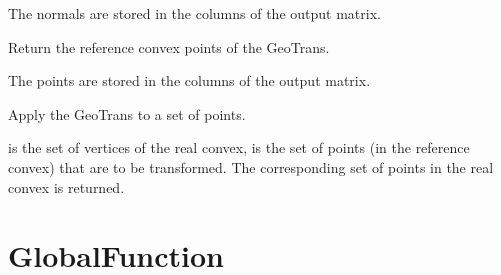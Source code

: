 \documentclass[a4paper,11pt,english]{sphinxmanual}
\begin{document}
\begin{fulllineitems}
\begin{fulllineitems}
The normals are stored in the columns of the output matrix.

\end{fulllineitems}


\begin{fulllineitems}
\label{\detokenize{python/cmdref_GeoTrans:getfem.GeoTrans.pts}}
Return the reference convex points of the GeoTrans.

The points are stored in the columns of the output matrix.

\end{fulllineitems}


\begin{fulllineitems}
\label{\detokenize{python/cmdref_GeoTrans:getfem.GeoTrans.transform}}
Apply the GeoTrans to a set of points.

 is the set of vertices of the real convex,  is the set
of points (in the reference convex) that are to be transformed.
The corresponding set of points in the real convex is returned.

\end{fulllineitems}


\end{fulllineitems}



\section{GlobalFunction}
\label{\detokenize{python/cmdref_GlobalFunction:globalfunction}}\label{\detokenize{python/cmdref_GlobalFunction::doc}}
\end{document}
